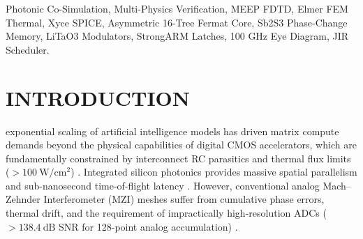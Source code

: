 \documentclass[journal]{IEEEtran}
\begin{document}
\begin{abstract}
Full-wave and transient simulations deliver authoritative physical parameters: wide-bandgap sub-bandgap $\mathrm{Sb_2S_3}$ non-volatile phase-change switches achieve $0.2627~\mathrm{dB}$ amorphous insertion loss (design target $\le 0.50~\mathrm{dB}$) and $18.96~\mathrm{dB}$ worst-case SCR ($52.16~\mathrm{dB}$ mean), thin-film $\mathrm{LiTaO_3}$ Pockels modulators operate at $100~\mathrm{GHz}$ ($r_{33} = 30.5~\mathrm{pm/V}$), parabolic MMI waveguide crossings yield $0.09143~\mathrm{dB}$ loss and $-57.77~\mathrm{dB}$ crosstalk, and receiverless $\mathrm{SAC^2M}$ Ge/Si avalanche photodetectors co-integrated with clocked StrongARM dynamic latches achieve a $+6.142~\mathrm{dB}$ practical sensitivity link margin. Elmer FEM demonstrates that vertical hydraulic shunting ($R_{\mathrm{th,up}} = 0.227~\mathrm{K/W}$ vs $R_{\mathrm{th,down}} = 0.488~\mathrm{K/W}$) combined with $18.5~\mathrm{kHz}$ Joint-Interleaved Rotation (JIR) clamps peak die temperature to $26.08^\circ\mathrm{C}$ during sustained execution, providing a $+43.92^\circ\mathrm{C}$ safety margin below the $70^\circ\mathrm{C}$ crystallization threshold ($\tau_{\mathrm{diff}} = 69.06~\mathrm{ms}$, $\Delta T_{\mathrm{cycle}} = 0.798~\mathrm{mK}$, ROM fit $R^2 = 0.9998$). At $100~\mathrm{GHz}$, optoelectronic receivers demonstrate a $74.47\%$ eye opening, an 80~ps CRT adder-tree latency (8 pipelined stages), and raw $\mathrm{BER} = 5.928 \times 10^{-32} \le 10^{-18}$. All 16 quantitative verification benchmarks achieve $100\%$ pass status, establishing fabrication sign-off readiness (TRL~4 $\to$ TRL~5) for monolithic MPW shuttle tapeout.
\end{abstract}

\begin{IEEEkeywords}
Photonic Co-Simulation, Multi-Physics Verification, MEEP FDTD, Elmer FEM Thermal, Xyce SPICE, Asymmetric 16-Tree Fermat Core, Sb2S3 Phase-Change Memory, LiTaO3 Modulators, StrongARM Latches, 100 GHz Eye Diagram, JIR Scheduler.
\end{IEEEkeywords}

\section{INTRODUCTION}

 exponential scaling of artificial intelligence models has driven matrix compute demands beyond the physical capabilities of digital CMOS accelerators, which are fundamentally constrained by interconnect RC parasitics and thermal flux limits ($>100~\mathrm{W/cm^2}$) \cite{Miller2017}\cite{Shen2017}\cite{Feldmann2021}. Integrated silicon photonics provides massive spatial parallelism and sub-nanosecond time-of-flight latency \cite{Shastri2021}\cite{Bogaerts2020}. However, conventional analog Mach--Zehnder Interferometer (MZI) meshes suffer from cumulative phase errors, thermal drift, and the requirement of impractically high-resolution ADCs ($>138.4~\mathrm{dB}$ SNR for 128-point analog accumulation) \cite{Harris2018}\cite{Sinatkas2021}.
\end{document}
